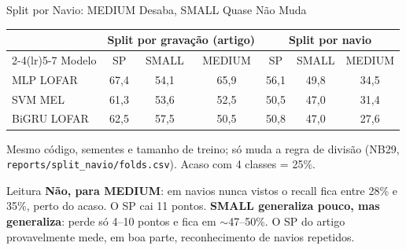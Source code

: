 \documentclass[aspectratio=169]{beamer}
\newcommand{\calo}[1]{\cellcolor{red!20}#1}
\begin{document}
\begin{frame}{Split por Navio: MEDIUM Desaba, SMALL Quase Não Muda}
    \footnotesize
    \begin{table}
    \centering
    \scriptsize
    \setlength{\tabcolsep}{4pt}
    \begin{tabular}{lcccccc}
    \toprule
     & \multicolumn{3}{c}{Split por gravação (artigo)} & \multicolumn{3}{c}{Split por navio} \\
    \cmidrule(lr){2-4}\cmidrule(lr){5-7}
    Modelo & SP & SMALL & MEDIUM & SP & SMALL & MEDIUM \\
    \midrule
    MLP LOFAR & 67,4 & 54,1 & 65,9 & 56,1 & 49,8 & \calo{34,5} \\
    SVM MEL & 61,3 & 53,6 & 52,5 & 50,5 & 47,0 & \calo{31,4} \\
    BiGRU LOFAR & 62,5 & 57,5 & 50,5 & 50,8 & 47,0 & \calo{27,6} \\
    \bottomrule
    \end{tabular}
    \end{table}
    {\tiny Mesmo código, sementes e tamanho de treino; só muda a regra de divisão (NB29, \texttt{reports/split\_navio/folds.csv}). Acaso com 4 classes = 25\%.\par}
    \vspace{0.1cm}
    \begin{alertblock}{Leitura}
        \scriptsize
        \textbf{Não, para MEDIUM}: em navios nunca vistos o recall fica entre 28\% e 35\%, perto do acaso. O SP cai 11 pontos. \textbf{SMALL generaliza pouco, mas generaliza}: perde só 4--10 pontos e fica em $\sim$47--50\%. O SP do artigo provavelmente mede, em boa parte, reconhecimento de navios repetidos.
    \end{alertblock}
\end{frame}
\end{document}
